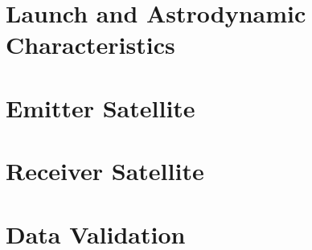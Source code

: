 \documentclass[11pt]{report}
\begin{document}
%
%
\chapter{Launch and Astrodynamic Characteristics}
\label{chap:astrodynamics}


%
%

\chapter{Emitter Satellite}
\label{chap:emitter}




%

%
%
	
\chapter{Receiver Satellite}
\label{chap:receiver}







%
%

\chapter{Data Validation}
\label{chap:sim}





%
%






%
%

%
%

%
%




%
%

\appendix
\end{document}

